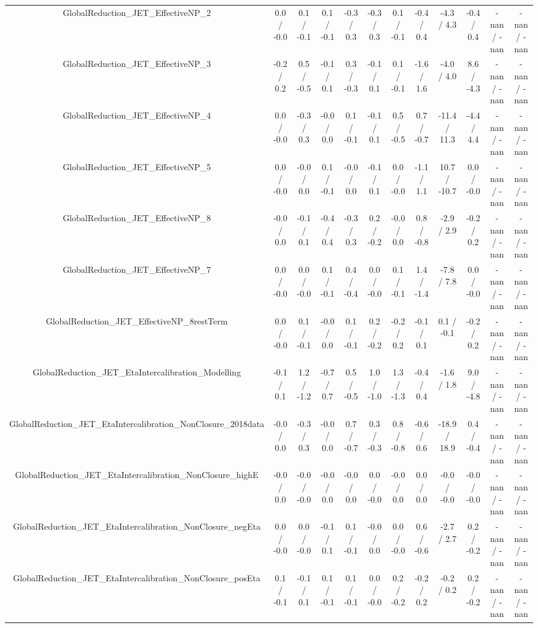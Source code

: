 \begin{table}[htbp]
\begin{center}
\begin{tabular}{|c|c|c|c|c|c|c|c|c|c|c|c|}
  GlobalReduction_JET_EffectiveNP_2 & 0.0 / -0.0 & 0.1 / -0.1 & 0.1 / -0.1 & -0.3 / 0.3 & -0.3 / 0.3 & 0.1 / -0.1 & -0.4 / 0.4 & -4.3 / 4.3 & -0.4 / 0.4 & -nan / -nan & -nan / -nan \\ 
  GlobalReduction_JET_EffectiveNP_3 & -0.2 / 0.2 & 0.5 / -0.5 & -0.1 / 0.1 & 0.3 / -0.3 & -0.1 / 0.1 & 0.1 / -0.1 & -1.6 / 1.6 & -4.0 / 4.0 & 8.6 / -4.3 & -nan / -nan & -nan / -nan \\ 
  GlobalReduction_JET_EffectiveNP_4 & 0.0 / -0.0 & -0.3 / 0.3 & -0.0 / 0.0 & 0.1 / -0.1 & -0.1 / 0.1 & 0.5 / -0.5 & 0.7 / -0.7 & -11.4 / 11.3 & -4.4 / 4.4 & -nan / -nan & -nan / -nan \\ 
  GlobalReduction_JET_EffectiveNP_5 & 0.0 / -0.0 & -0.0 / 0.0 & 0.1 / -0.1 & -0.0 / 0.0 & -0.1 / 0.1 & 0.0 / -0.0 & -1.1 / 1.1 & 10.7 / -10.7 & 0.0 / -0.0 & -nan / -nan & -nan / -nan \\ 
  GlobalReduction_JET_EffectiveNP_8 & -0.0 / 0.0 & -0.1 / 0.1 & -0.4 / 0.4 & -0.3 / 0.3 & 0.2 / -0.2 & -0.0 / 0.0 & 0.8 / -0.8 & -2.9 / 2.9 & -0.2 / 0.2 & -nan / -nan & -nan / -nan \\ 
  GlobalReduction_JET_EffectiveNP_7 & 0.0 / -0.0 & 0.0 / -0.0 & 0.1 / -0.1 & 0.4 / -0.4 & 0.0 / -0.0 & 0.1 / -0.1 & 1.4 / -1.4 & -7.8 / 7.8 & 0.0 / -0.0 & -nan / -nan & -nan / -nan \\ 
  GlobalReduction_JET_EffectiveNP_8restTerm & 0.0 / -0.0 & 0.1 / -0.1 & -0.0 / 0.0 & 0.1 / -0.1 & 0.2 / -0.2 & -0.2 / 0.2 & -0.1 / 0.1 & 0.1 / -0.1 & -0.2 / 0.2 & -nan / -nan & -nan / -nan \\ 
  GlobalReduction_JET_EtaIntercalibration_Modelling & -0.1 / 0.1 & 1.2 / -1.2 & -0.7 / 0.7 & 0.5 / -0.5 & 1.0 / -1.0 & 1.3 / -1.3 & -0.4 / 0.4 & -1.6 / 1.8 & 9.0 / -4.8 & -nan / -nan & -nan / -nan \\ 
  GlobalReduction_JET_EtaIntercalibration_NonClosure_2018data & -0.0 / 0.0 & -0.3 / 0.3 & -0.0 / 0.0 & 0.7 / -0.7 & 0.3 / -0.3 & 0.8 / -0.8 & -0.6 / 0.6 & -18.9 / 18.9 & 0.4 / -0.4 & -nan / -nan & -nan / -nan \\ 
  GlobalReduction_JET_EtaIntercalibration_NonClosure_highE & -0.0 / 0.0 & -0.0 / -0.0 & -0.0 / 0.0 & -0.0 / 0.0 & 0.0 / -0.0 & -0.0 / 0.0 & 0.0 / 0.0 & -0.0 / -0.0 & -0.0 / -0.0 & -nan / -nan & -nan / -nan \\ 
  GlobalReduction_JET_EtaIntercalibration_NonClosure_negEta & 0.0 / -0.0 & 0.0 / -0.0 & -0.1 / 0.1 & 0.1 / -0.1 & -0.0 / 0.0 & 0.0 / -0.0 & 0.6 / -0.6 & -2.7 / 2.7 & 0.2 / -0.2 & -nan / -nan & -nan / -nan \\ 
  GlobalReduction_JET_EtaIntercalibration_NonClosure_posEta & 0.1 / -0.1 & -0.1 / 0.1 & 0.1 / -0.1 & 0.1 / -0.1 & 0.0 / -0.0 & 0.2 / -0.2 & -0.2 / 0.2 & -0.2 / 0.2 & 0.2 / -0.2 & -nan / -nan & -nan / -nan \\ 

\end{tabular}
\end{center}
\end{table}
